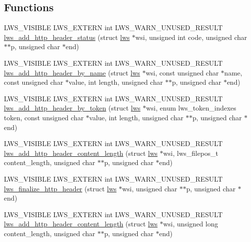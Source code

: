 \subsection*{Functions}
\begin{DoxyCompactItemize}
\item 
L\+W\+S\+\_\+\+V\+I\+S\+I\+B\+LE L\+W\+S\+\_\+\+E\+X\+T\+E\+RN int L\+W\+S\+\_\+\+W\+A\+R\+N\+\_\+\+U\+N\+U\+S\+E\+D\+\_\+\+R\+E\+S\+U\+LT \hyperlink{group__HTTP-headers-create_ga29b7d6d2ddfdbaff3d8b607e7e3151b6}{lws\+\_\+add\+\_\+http\+\_\+header\+\_\+status} (struct \hyperlink{structlws}{lws} $\ast$wsi, unsigned int code, unsigned char $\ast$$\ast$p, unsigned char $\ast$end)
\item 
L\+W\+S\+\_\+\+V\+I\+S\+I\+B\+LE L\+W\+S\+\_\+\+E\+X\+T\+E\+RN int L\+W\+S\+\_\+\+W\+A\+R\+N\+\_\+\+U\+N\+U\+S\+E\+D\+\_\+\+R\+E\+S\+U\+LT \hyperlink{group__HTTP-headers-create_ga2b36bf44405755ff51c1939303b995a8}{lws\+\_\+add\+\_\+http\+\_\+header\+\_\+by\+\_\+name} (struct \hyperlink{structlws}{lws} $\ast$wsi, const unsigned char $\ast$name, const unsigned char $\ast$value, int length, unsigned char $\ast$$\ast$p, unsigned char $\ast$end)
\item 
L\+W\+S\+\_\+\+V\+I\+S\+I\+B\+LE L\+W\+S\+\_\+\+E\+X\+T\+E\+RN int L\+W\+S\+\_\+\+W\+A\+R\+N\+\_\+\+U\+N\+U\+S\+E\+D\+\_\+\+R\+E\+S\+U\+LT \hyperlink{group__HTTP-headers-create_gaf74adb761b22566ad70004882712dce1}{lws\+\_\+add\+\_\+http\+\_\+header\+\_\+by\+\_\+token} (struct \hyperlink{structlws}{lws} $\ast$wsi, enum lws\+\_\+token\+\_\+indexes token, const unsigned char $\ast$value, int length, unsigned char $\ast$$\ast$p, unsigned char $\ast$end)
\item 
L\+W\+S\+\_\+\+V\+I\+S\+I\+B\+LE L\+W\+S\+\_\+\+E\+X\+T\+E\+RN int L\+W\+S\+\_\+\+W\+A\+R\+N\+\_\+\+U\+N\+U\+S\+E\+D\+\_\+\+R\+E\+S\+U\+LT \hyperlink{group__HTTP-headers-create_gaeec7aa44c8553aeae9241c6a4e18321f}{lws\+\_\+add\+\_\+http\+\_\+header\+\_\+content\+\_\+length} (struct \hyperlink{structlws}{lws} $\ast$wsi, lws\+\_\+filepos\+\_\+t content\+\_\+length, unsigned char $\ast$$\ast$p, unsigned char $\ast$end)
\item 
L\+W\+S\+\_\+\+V\+I\+S\+I\+B\+LE L\+W\+S\+\_\+\+E\+X\+T\+E\+RN int L\+W\+S\+\_\+\+W\+A\+R\+N\+\_\+\+U\+N\+U\+S\+E\+D\+\_\+\+R\+E\+S\+U\+LT \hyperlink{group__HTTP-headers-create_ga4887605ff2242a54db3a7fa01f6f864b}{lws\+\_\+finalize\+\_\+http\+\_\+header} (struct \hyperlink{structlws}{lws} $\ast$wsi, unsigned char $\ast$$\ast$p, unsigned char $\ast$end)
\item 
L\+W\+S\+\_\+\+V\+I\+S\+I\+B\+LE L\+W\+S\+\_\+\+E\+X\+T\+E\+RN int L\+W\+S\+\_\+\+W\+A\+R\+N\+\_\+\+U\+N\+U\+S\+E\+D\+\_\+\+R\+E\+S\+U\+LT \hyperlink{group__HTTP-headers-create_gacc76a5babcb4dce1b01b1955aa7a2faf}{lws\+\_\+add\+\_\+http\+\_\+header\+\_\+content\+\_\+length} (struct \hyperlink{structlws}{lws} $\ast$wsi, unsigned long content\+\_\+length, unsigned char $\ast$$\ast$p, unsigned char $\ast$end)
\end{DoxyCompactItemize}


